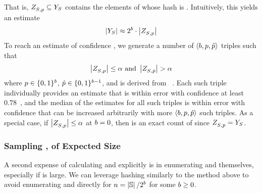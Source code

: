 That is, $Z_{{S_{}},{p}}^{}
\subseteq Y_{S_{}}$ contains the elements of
\possibleDoubles{\secretsSet{} } whose hash is \hashFnOutputPrefix.
Intuitively, this yields an estimate
\begin{align}
\left|{Y_{S_{}}}\right| \approx
2^{b} \cdot
\left|{Z_{{S_{}},{p}}^{}}\right|
\label{eqn:possibleDoublesEstimate}
\end{align}
To reach an estimate of confidence \confidence, we generate a number
of $\langle b, p,
\hat{p}\rangle$ triples such that
\begin{align}
 \setSize{\possibleDoublesSubset{\secretsSet{}}{\hashFnOutputPrefix}{}}\leq\pivot \textrm{ and } 
\setSize{\possibleDoublesSubset{\secretsSet{}}{\hashFnOutputPrefixAlt}{}}>\pivot 
\label{eqn:pivot}
\end{align}
where $p \in \{0,1\}^{b}$,
$\hat{p} \in \{0,1\}^{b-1}$, and
\pivot is derived from
\error~\cite{Chakraborty:2013:SAM:2961240.2961265}.  Each such triple
individually provides an estimate that is within error \error with
confidence at least
$0.78$~\cite[Lemma~1]{Chakraborty:2013:SAM:2961240.2961265}, and the
median of the estimates for all such triples is within error \error
with confidence that can be increased arbitrarily with more
$\langle
b, p,
\hat{p}\rangle$ such triples.  As a special case, if
$\left|{Z_{{S_{}},{p}}^{}}\right|
\le \alpha$ at $b=0$, then
\setSize{\possibleDoublesSubset{\secretsSet{}}{\hashFnOutputPrefix}{}}
is an exact count of \setSize{\possibleDoubles{\secretsSet{}}} since
$Z_{{S_{}},{p}}^{} =
Y_{S_{}}$.

\subsubsection{Sampling \secretsSet{}, \secretsSetAlt{} of Expected
  Size \secretsSetSize}
\label{sscf:sec:impl:hash:secretsSetSize}

A second expense of calculating \possibleDoubles{\secretsSet{}} and
\possibleDoubles{\secretsSetAlt{}} explicitly is in enumerating
\secretsSet{} and \secretsSetAlt{} themselves, especially if
\secretsSetSize is large.  We can leverage hashing similarly to the
method above to avoid enumerating \secretsSet{} and \secretsSetAlt{}
directly for {$n = \left|{\mathbb{S}}\right|/2^{b}$} for some
$b \ge 0$.

